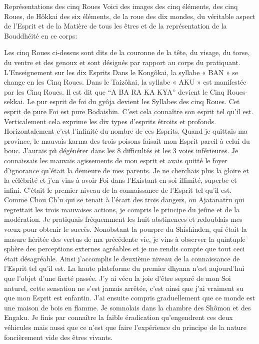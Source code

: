 Représentations des cinq Roues
Voici des images des cinq éléments, des cinq Roues, de Hôkkai des six éléments, de la roue des dix mondes, du véritable aspect de l’Esprit et de la Matière de tous les êtres et de la représentation de la Bouddhéité en ce corps:













Les cinq Roues ci-dessus sont dits de la couronne de la tête, du visage, du torse, du ventre et des genoux et sont désignés par rapport au corps du pratiquant.
L'Enseignement sur les dix Esprits
Dans le Kongôkai, la syllabe « BAN » se change en les Cinq Roues. Dans le Taizôkai, la syllabe « AKU » est manifestée par les Cinq Roues. Il est dit que “A BA RA KA KYA” devient le Cinq Roues-sekkai. Le pur esprit de foi du gyôja devient les Syllabes des cinq Roues. Cet esprit de pure Foi est pure Bodaishin. C’est cela connaître son esprit tel qu’il est. Verticalement cela exprime les  dix types d’esprits étroits et profonds. Horizontalement c’est l’infinité du nombre de ces Esprits.
Quand je quittais ma province, le mauvais karma des trois poisons faisait mon Esprit pareil à celui du bouc. J'aurais pû dégénérer dans les 8 difficultés et les 3 voies inférieures.
Je connaissais les mauvais agissements de mon esprit et avais quitté le foyer d’ignorance qu'était la demeure de mes parents. Je ne cherchais plus la gloire et la célébrité et j'en vins à avoir Foi dans l’Existant-en-soi illimité, superbe et infini. C'était le premier niveau de la connaissance de l'Esprit tel qu'il est.
Comme Chou Ch’u qui se tenait à l’écart des trois dangers, ou Ajatanatru qui regrettait les trois mauvaises actions, je compris le principe du jeûne et de la modération. Je pratiquais fréquemment les huit abstinences et redoublais mes vœux pour obtenir le succès.
Nonobstant la pourpre du Shishinden, qui était la masure héritée des vertus de ma précédente vie, je vins à observer la quintuple sphère des perceptions externes agréables et je me rendis compte que tout ceci était désagréable. Ainsi j'accomplis le deuxième niveau de la connaissance de l'Esprit tel qu'il est.
La haute plateforme du premier dhyana n'est aujourd'hui que l'objet d'une fierté passée. J'y ai vécu la joie d'être separé de mon Soi naturel, cette sensation ne s'est jamais arrêtée, c'est ainsi que j'ai vraiment su que mon Esprit est enfantin.
J'ai ensuite compris graduellement que ce monde est une maison de bois en flamme. Je somnolais dans la chambre des Shômon et des Engaku. Je finis par connaître la faible éradication qu’engendrent ces deux véhicules mais aussi que ce n'est que faire l’expérience du principe de la nature foncièrement vide des êtres vivants.
